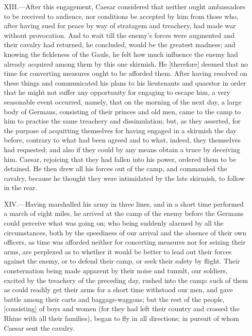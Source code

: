XIII.—After this engagement, Caesar considered that neither ought
ambassadors to be received to audience, nor conditions be accepted by
him from those who, after having sued for peace by way of stratagem and
treachery, had made war without provocation. And to wait till the
enemy's forces were augmented and their cavalry had returned, he
concluded, would be the greatest madness; and knowing the fickleness of
the Gauls, he felt how much influence the enemy had already acquired
among them by this one skirmish. He [therefore] deemed that no time for
converting measures ought to be afforded them. After having resolved on
these things and communicated his plans to his lieutenants and quaestor
in order that he might not suffer any opportunity for engaging to escape
him, a very seasonable event occurred, namely, that on the morning of
the next day, a large body of Germans, consisting of their princes and
old men, came to the camp to him to practise the same treachery and
dissimulation; but, as they asserted, for the purpose of acquitting
themselves for having engaged in a skirmish the day before, contrary to
what had been agreed and to what, indeed, they themselves had requested;
and also if they could by any means obtain a truce by deceiving him.
Caesar, rejoicing that they had fallen into his power, ordered them to
be detained. He then drew all his forces out of the camp, and commanded
the cavalry, because he thought they were intimidated by the late
skirmish, to follow in the rear.

XIV.—Having marshalled his army in three lines, and in a short time
performed a march of eight miles, he arrived at the camp of the enemy
before the Germans could perceive what was going on; who being suddenly
alarmed by all the circumstances, both by the speediness of our arrival
and the absence of their own officers, as time was afforded neither for
concerting measures nor for seizing their arms, are perplexed as to
whether it would be better to lead out their forces against the enemy,
or to defend their camp, or seek their safety by flight. Their
consternation being made apparent by their noise and tumult, our
soldiers, excited by the treachery of the preceding day, rushed into the
camp: such of them as could readily get their arms for a short time
withstood our men, and gave battle among their carts and baggage-waggons;
but the rest of the people, [consisting] of boys and women (for they had
left their country and crossed the Rhine with all their families), began
to fly in all directions; in pursuit of whom Caesar sent the cavalry.

